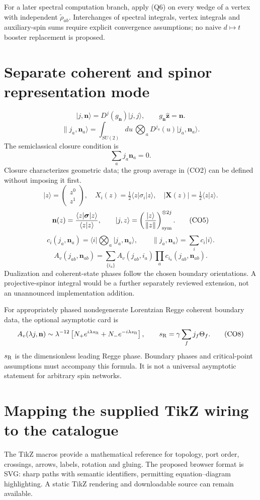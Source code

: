 \documentclass[11pt,a4paper]{article}
\newcommand{\ket}[1]{\lvert #1\rangle}
\newcommand{\bra}[1]{\langle #1\rvert}
\newcommand{\eq}[2]{\begin{equation}#2\tag{#1}\end{equation}}
\begin{document}
For a later spectral computation branch, apply (Q6) on every wedge of a vertex with independent $\widetilde\rho_{ab}$. Interchanges of spectral integrals, vertex integrals and auxiliary-spin sums require explicit convergence assumptions; no naive $d\mapsto t$ booster replacement is proposed.

\section{Separate coherent and spinor representation mode}
\eq{CO1}{\ket{j,\mathbf n}=D^j(g_{\mathbf n})\ket{j,j},\qquad g_{\mathbf n}\hat{\mathbf z}=\mathbf n.}
\eq{CO2}{\|j_a,\mathbf n_a\rangle=\int_{SU(2)}du\,\bigotimes_aD^{j_a}(u)\ket{j_a,\mathbf n_a}.}
The semiclassical closure condition is
\eq{CO3}{\sum_aj_a\mathbf n_a=0.}
Closure characterizes geometric data; the group average in (CO2) can be defined without imposing it first.
\eq{CO4}{\ket z=\begin{pmatrix}z^0\\z^1\end{pmatrix},\quad X_i(z)=\tfrac12\bra z\sigma_i\ket z,\quad|\mathbf X(z)|=\tfrac12\langle z|z\rangle.}
\eq{CO5}{\mathbf n(z)=\frac{\bra z\boldsymbol\sigma\ket z}{\langle z|z\rangle},\qquad\ket{j,z}=\left(\frac{\ket z}{\|z\|}\right)_{\rm sym}^{\otimes2j}.}
\eq{CO6}{c_i(j_a,\mathbf n_a)=\bra i\bigotimes_a\ket{j_a,\mathbf n_a},\qquad\|j_a,\mathbf n_a\rangle=\sum_i c_i\ket i.}
\eq{CO7}{A_v(j_{ab},\mathbf n_{ab})=\sum_{\{i_a\}}A_v(j_{ab},i_a)\prod_ac_{i_a}(j_{ab},\mathbf n_{ab}).}
Dualization and coherent-state phases follow the chosen boundary orientations. A projective-spinor integral would be a further separately reviewed extension, not an unannounced implementation addition.

For appropriately phased nondegenerate Lorentzian Regge coherent boundary data, the optional asymptotic card is
\eq{CO8}{A_v(\lambda j,\mathbf n)\sim\lambda^{-12}\left[N_+e^{i\lambda s_{\rm R}}+N_-e^{-i\lambda s_{\rm R}}\right],\qquad s_{\rm R}=\gamma\sum_fj_f\Theta_f.}
$s_{\rm R}$ is the dimensionless leading Regge phase. Boundary phases and critical-point assumptions must accompany this formula. It is not a universal asymptotic statement for arbitrary spin networks.

\section{Mapping the supplied TikZ wiring to the catalogue}
The TikZ macros provide a mathematical reference for topology, port order, crossings, arrows, labels, rotation and gluing. The proposed browser format is SVG: sharp paths with semantic identifiers, permitting equation--diagram highlighting. A static TikZ rendering and downloadable source can remain available.
\end{document}
